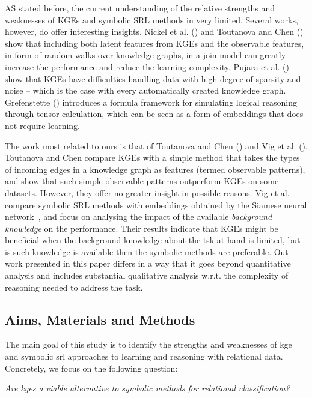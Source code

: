 AS stated before, the current understanding of the relative strengths and weaknesses of KGEs and symbolic SRL methods in very limited.
Several works, however, do offer interesting insights.
Nickel et al. (\cite{NickleNIPS2014}) and Toutanova and Chen (\cite{toutanova2015observed}) show that including both latent features from KGEs and the observable features, in form of random walks over knowledge graphs, in a join model can greatly increase the performance and reduce the learning complexity.
Pujara et al. (\cite{pujara:emnlp17}) show that KGEs have difficulties handling data with high degree of sparsity and noise -- which is the case with every automatically created knowledge graph.  
Grefenstette (\cite{GrefenstetteTFDS}) introduces a formula framework for simulating logical reasoning through tensor calculation, which can be seen as a form of embeddings that does not require learning.


The work most related to ours is that of Toutanova and Chen (\cite{toutanova2015observed}) and Vig et al. (\cite{VigILP2017}).
Toutanova and Chen compare KGEs with a simple method that takes the types of incoming edges in a knowledge graph as features (termed observable patterns), and show that such simple observable patterns outperform KGEs on some datasets.
However, they offer no greater insight in possible reasons.
Vig et al.  compare symbolic SRL methods with embeddings obtained by the Siamese neural network~\cite{Bromley:1993:SVU:2987189.2987282}, and focus on analysing the impact of the available \textit{background knowledge} on the performance.
Their results indicate that KGEs might be beneficial when the background knowledge about the tsk at hand is limited, but is such knowledge is available then the symbolic methods are preferable.
Out work presented in this paper differs in a way that it goes beyond quantitative analysis and includes substantial qualitative analysis w.r.t. the complexity of reasoning needed to address the task.



\subsection{Aims, Materials and Methods}

The main goal of this study is to identify the strengths and weaknesses of  \gls{kge} and symbolic \gls{srl} approaches to learning and reasoning with relational data.
Concretely, we focus on the following question:

\begin{displayquote}
\textit{Are \gls{kge}s a viable alternative to symbolic methods for relational classification?}
\end{displayquote}

